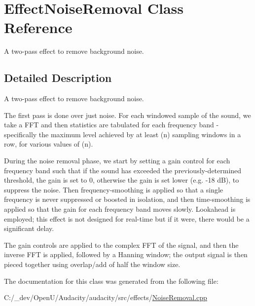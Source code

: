 \hypertarget{class_effect_noise_removal}{}\section{Effect\+Noise\+Removal Class Reference}
\label{class_effect_noise_removal}


A two-\/pass effect to remove background noise.  




\subsection{Detailed Description}
A two-\/pass effect to remove background noise. 

The first pass is done over just noise. For each windowed sample of the sound, we take a F\+FT and then statistics are tabulated for each frequency band -\/ specifically the maximum level achieved by at least (n) sampling windows in a row, for various values of (n).

During the noise removal phase, we start by setting a gain control for each frequency band such that if the sound has exceeded the previously-\/determined threshold, the gain is set to 0, otherwise the gain is set lower (e.\+g. -\/18 dB), to suppress the noise. Then frequency-\/smoothing is applied so that a single frequency is never suppressed or boosted in isolation, and then time-\/smoothing is applied so that the gain for each frequency band moves slowly. Lookahead is employed; this effect is not designed for real-\/time but if it were, there would be a significant delay.

The gain controls are applied to the complex F\+FT of the signal, and then the inverse F\+FT is applied, followed by a Hanning window; the output signal is then pieced together using overlap/add of half the window size. 

The documentation for this class was generated from the following file\+:\begin{DoxyCompactItemize}
\item 
C\+:/\+\_\+dev/\+Open\+U/\+Audacity/audacity/src/effects/\hyperlink{_noise_removal_8cpp}{Noise\+Removal.\+cpp}\end{DoxyCompactItemize}
